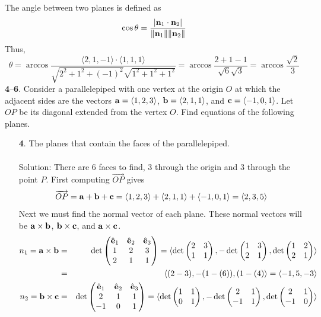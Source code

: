 \documentclass[12pt]{amsbook}
\newcommand{\la}{\langle}
\newcommand{\ra}{\rangle}
\begin{document}
\\
\\
The angle between two planes is defined as
$$\cos\theta=\frac{|{\bf n}_1\cdot{\bf n}_2|}{\|{\bf n}_1\|\|{\bf n}_2\|}$$
Thus,
$$\theta=\arccos\frac{\la 2,1,-1 \ra \cdot \la 1,1,1 \ra }{\sqrt{2^2+1^2+(-1)^2}\sqrt{1^2+1^2+1^2}}=\arccos\frac{2+1-1}{\sqrt{6}\sqrt{3}}=\arccos\frac{\sqrt{2}}{3}$$
{\small\bf 4}--{\small\bf 6}. Consider a parallelepiped with one vertex 
at the origin $O$
at which the adjacent sides are the vectors ${\bf a}=\la
1,2,3\ra$, ${\bf b}=\la 2,1,1\ra$, and ${\bf c}=\la -1,0,1\ra$.
Let $OP$ be its  diagonal extended from the vertex $O$.
Find equations of the following planes.
\begin{enumerate}
\item[{\small\bf 4}.] The planes that contain the faces of the
parallelepiped.\\
\\
{\sc Solution}: There are 6 faces to find, 3 through the origin and 3 through the point $P$. First computing $\overrightarrow{OP}$ gives 
$$\overrightarrow{OP}={\bf a}+{\bf b}+{\bf c}=\la 1,2,3 \ra + \la 2,1,1 \ra + \la -1,0,1 \ra = \la 2,3, 5 \ra$$
Next we must find the normal vector of each plane. These normal vectors will be ${\bf a}\times{\bf b}$, ${\bf b}\times{\bf c}$, and ${\bf a}\times{\bf c}$.
\\ 
\begin{eqnarray*}
n_1={\bf a}\times{\bf b}&=&\det
\begin{pmatrix}
\hat{\bf e}_1 & \hat{\bf e}_2 & \hat{\bf e}_3\cr 1&2&3\cr 2&1&1 \end{pmatrix}=\la \det\begin{pmatrix}2&3\cr 1&1  \end{pmatrix},-\det\begin{pmatrix}1&3\cr 2&1  \end{pmatrix},\det\begin{pmatrix}1&2\cr 2&1 \end{pmatrix} \ra \\
&=&\la (2-3), -(1-(6)), (1-(4) \ra =\la -1,5,-3 \ra \\
n_2={\bf b}\times{\bf c}&=&\det
\begin{pmatrix}
\hat{\bf e}_1 & \hat{\bf e}_2 & \hat{\bf e}_3\cr 2&1&1\cr -1&0&1 \end{pmatrix}=\la\det\begin{pmatrix}1&1\cr 0&1  \end{pmatrix},-\det\begin{pmatrix}2&1\cr -1&1  \end{pmatrix}, \det\begin{pmatrix}2&1\cr -1&0 \end{pmatrix} \ra \\

\end{eqnarray*}
\end{enumerate}
\end{document}
